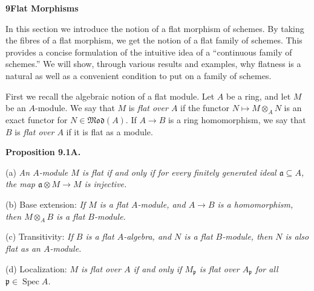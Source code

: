 {\medskip
\noindent\hypertarget{sec-III-9}{}{\large\bfseries 9\quad Flat Morphisms}\par
\smallskip
In this section we introduce the notion of a flat morphism of schemes. By taking the fibres of a flat morphism, we get the notion of a flat family of schemes. This provides a concise formulation of the intuitive idea of a \textquotedblleft{}continuous family of schemes.\textquotedblright{} We will show, through various results and examples, why flatness is a natural as well as a convenient condition to put on a family of schemes.

First we recall the algebraic notion of a flat module. Let $A$ be a ring, and let $M$ be an $A$-module. We say that $M$ is \emph{flat over $A$} if the functor $N\mapsto M\otimes_A N$ is an exact functor for $N\in\mathfrak{Mod}(A)$. If $A\to B$ is a ring homomorphism, we say that $B$ is \emph{flat over $A$} if it is flat as a module.

\smallskip
\noindent\hypertarget{result-III-9.1A}{}\textbf{Proposition 9.1A.}

\noindent\hspace*{1.7em}\hypertarget{result-III-9.1A-a}{}(a) \emph{An $A$-module $M$ is flat if and only if for every finitely generated ideal $\mathfrak a\subseteq A$, the map $\mathfrak a\otimes M\to M$ is injective.}

\noindent\hspace*{1.7em}(b) Base extension: \emph{If $M$ is a flat $A$-module, and $A\to B$ is a homomorphism, then $M\otimes_A B$ is a flat $B$-module.}

\noindent\hspace*{1.7em}(c) Transitivity: \emph{If $B$ is a flat $A$-algebra, and $N$ is a flat $B$-module, then $N$ is also flat as an $A$-module.}

\noindent\hspace*{1.7em}(d) Localization: \emph{$M$ is flat over $A$ if and only if $M_{\mathfrak p}$ is flat over $A_{\mathfrak p}$ for all $\mathfrak p\in\operatorname{Spec}A$.}}
